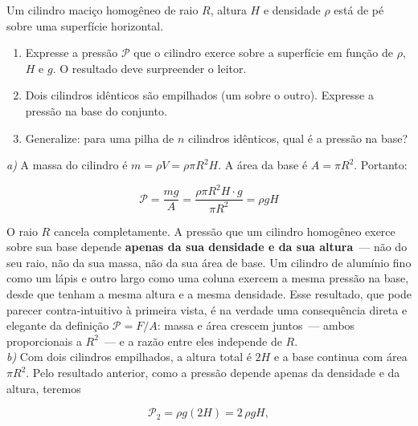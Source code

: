 \begin{exemplo}[Nível II]\label{exemplo_fluidos_pressaoex02}

Um cilindro maciço homogêneo de raio $R$, altura $H$ e densidade $\rho$ está de pé sobre uma superfície horizontal.
 
\begin{enumerate}
    \item [a)] Expresse a pressão $\mathcal{P}$ que o cilindro exerce
          sobre a superfície em função de $\rho$, $H$ e $g$.
          O resultado deve surpreender o leitor.
    \item [b)] Dois cilindros idênticos são empilhados (um sobre o outro).
          Expresse a pressão na base do conjunto.
    \item [c)] Generalize: para uma pilha de $n$ cilindros idênticos,
          qual é a pressão na base?

\end{enumerate}

\resolucao

\textit{a)} A massa do cilindro é $m = \rho V = \rho \pi R^2 H$.
A área da base é $A = \pi R^2$. Portanto:
 
\begin{equation}
    \mathcal{P} = \frac{mg}{A}
               = \frac{\rho \pi R^2 H \cdot g}{\pi R^2}
               = \boxed{\rho g H}
    \label{eq:pressao_cilindro}
\end{equation}
 
O raio $R$ cancela completamente. A pressão que um cilindro
homogêneo exerce sobre sua base depende \textbf{apenas da sua
densidade e da sua altura}~--- não do seu raio, não da sua massa,
não da sua área de base. Um cilindro de alumínio fino como um
lápis e outro largo como uma coluna exercem a mesma pressão na
base, desde que tenham a mesma altura e a mesma densidade. Esse
resultado, que pode parecer contra-intuitivo à primeira vista,
é na verdade uma consequência direta e elegante da definição
$\mathcal{P} = F/A$: massa e área crescem juntos~--- ambos
proporcionais a $R^2$~--- e a razão entre eles independe de $R$. \\
 
\textit{b)} Com dois cilindros empilhados, a altura total é $2H$
e a base continua com área $\pi R^2$. Pelo resultado anterior, como a pressão depende apenas da densidade e da altura, teremos
 
\begin{equation*}
    \mathcal{P}_2 = \rho g (2H) = 2\,\rho g H,
\end{equation*}
 

\end{exemplo}
